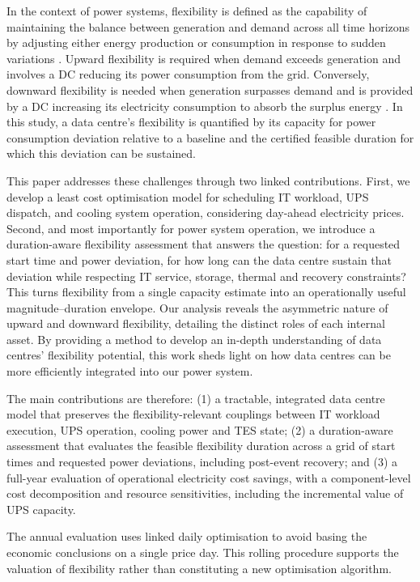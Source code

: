 \documentclass[lettersize,journal]{IEEEtran}
\begin{document}
In the context of power systems, flexibility is defined as the capability of maintaining the balance between generation and demand across all time horizons by adjusting either energy production or consumption in response to sudden variations \cite{Centrica2020LEM, EEAACER2023Flex, neso2025future, Nosair2015TSTE}. Upward flexibility is required when demand exceeds generation and involves a DC reducing its power consumption from the grid. Conversely, downward flexibility is needed when generation surpasses demand and is provided by a DC increasing its electricity consumption to absorb the surplus energy \cite{Centrica2020LEM, NG2017SNAPS}. In this study, a data centre's flexibility is quantified by its capacity for power consumption deviation relative to a baseline and the certified feasible duration for which this deviation can be sustained.

This paper addresses these challenges through two linked contributions. First, we develop a least cost optimisation model for scheduling IT workload, UPS dispatch, and cooling system operation, considering day-ahead electricity prices. Second, and most importantly for power system operation, we introduce a duration-aware flexibility assessment that answers the question: for a requested start time and power deviation, for how long can the data centre sustain that deviation while respecting IT service, storage, thermal and recovery constraints? This turns flexibility from a single capacity estimate into an operationally useful magnitude--duration envelope. Our analysis reveals the asymmetric nature of upward and downward flexibility, detailing the distinct roles of each internal asset. By providing a method to develop an in-depth understanding of data centres' flexibility potential, this work sheds light on how data centres can be more efficiently integrated into our power system.

The main contributions are therefore: (1) a tractable, integrated data centre model that preserves the flexibility-relevant couplings between IT workload execution, UPS operation, cooling power and TES state; (2) a duration-aware assessment that evaluates the feasible flexibility duration across a grid of start times and requested power deviations, including post-event recovery; and (3) a full-year evaluation of operational electricity cost savings, with a component-level cost decomposition and resource sensitivities, including the incremental value of UPS capacity.

The annual evaluation uses linked daily optimisation to avoid basing the economic conclusions on a single price day. This rolling procedure supports the valuation of flexibility rather than constituting a new optimisation algorithm.
\end{document}
